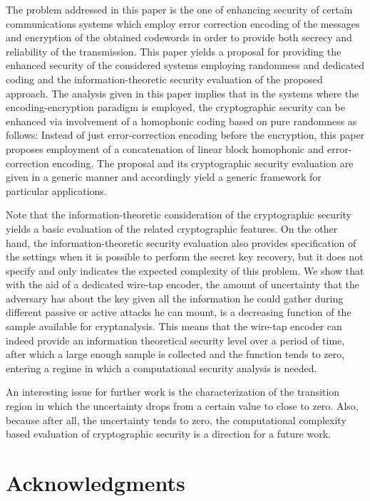 \documentclass{article}[11pt]
\begin{document}
The problem addressed in this paper is the one of enhancing
security of certain communications systems which employ error
correction encoding of the messages and encryption of the obtained
codewords in order to provide both secrecy and reliability of
the transmission. This paper yields a proposal for providing the
enhanced security of the considered systems employing randomness
and dedicated coding and the information-theoretic security
evaluation of the proposed approach. The analysis given in this
paper implies that in the systems where the encoding-encryption
paradigm is employed, the cryptographic security can
be enhanced via involvement of a homophonic coding based on pure
randomness as follows: Instead of just error-correction encoding
before the encryption, this paper proposes employment of a
concatenation of linear block homophonic and error-correction
encoding. The proposal and its cryptographic security evaluation
are given in a generic manner and accordingly yield a generic
framework for particular applications.

Note that the information-theoretic consideration of the
cryptographic security yields a basic evaluation of the related
cryptographic features. On the other hand, the
information-theoretic security evaluation also provides
specification of the settings when it is possible to perform the
secret key recovery, but it does not specify and only indicates
the expected complexity of this problem. We show that with the aid
of a dedicated wire-tap encoder, the amount of uncertainty that
the adversary has about the key given all the information he could
gather during different passive or active attacks he can mount, is
a decreasing function of the sample available for cryptanalysis.
This means that the wire-tap encoder can indeed provide an
information theoretical security level over a period of time,
after which a large enough sample is collected and the function
tends to zero, entering a regime in which a computational security
analysis is needed.

An interesting issue for further work is the characterization of
the transition region in which the uncertainty drops from a
certain value to close to zero. Also, because after all, the
uncertainty tends to zero, the computational complexity based
evaluation of cryptographic security is a direction for a future
work.



\section*{Acknowledgments}
\end{document}
